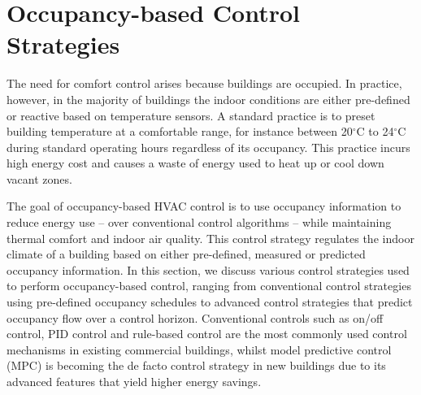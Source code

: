 

\section{Occupancy-based Control Strategies} \label{cha:bg:ctrl}

The need for comfort control arises because buildings are occupied.
In practice, however, in the majority of buildings the indoor conditions are either pre-defined or reactive based on temperature sensors. A standard practice is to preset building temperature at a comfortable range, for instance between 20$^\circ$C to 24$^\circ$C during standard operating hours regardless of its occupancy. This practice incurs high energy cost and causes a waste of energy used to heat up or cool down vacant zones. 

The goal of occupancy-based HVAC control is to use occupancy information to reduce energy use -- over conventional control algorithms -- while maintaining thermal comfort and indoor air quality. This control strategy regulates the indoor climate of a building based on either pre-defined, measured or predicted occupancy information. In this section, we discuss various control strategies used to perform occupancy-based control, ranging from conventional control strategies using pre-defined occupancy schedules to advanced control strategies that predict occupancy flow over a control horizon. Conventional controls such as on/off control, PID control and rule-based control are the most commonly used control mechanisms in existing commercial buildings, whilst model predictive control (MPC) is becoming the de facto control strategy in new buildings due to its advanced features that yield higher energy savings.

